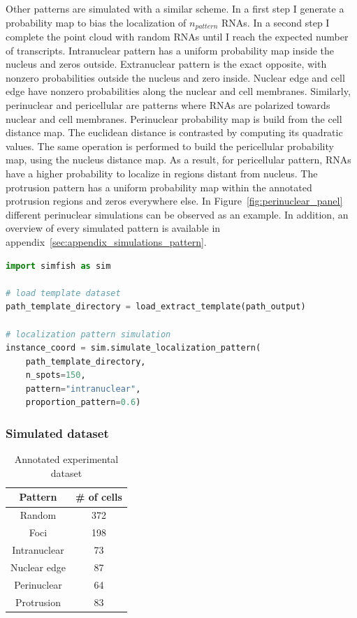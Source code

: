 Other patterns are simulated with a similar scheme.
In a first step I generate a probability map to bias the localization of $n_{pattern}$ \ac{RNA}s.
In a second step I complete the point cloud with random \ac{RNA}s until I reach the expected number of transcripts.
Intranuclear pattern has a uniform probability map inside the nucleus and zeros outside.
Extranuclear pattern is the exact opposite, with nonzero probabilities outside the nucleus and zero inside.
Nuclear edge and cell edge have nonzero probabilities along the nuclear and cell membranes.
Similarly, perinuclear and pericellular are patterns where \ac{RNA}s are polarized towards nuclear and cell membranes.
Perinuclear probability map is build from the cell distance map.
The euclidean distance is contrasted by computing its quadratic values.
The same operation is performed to build the pericellular probability map, using the nucleus distance map.
As a result, for pericellular pattern, \ac{RNA}s have a higher probability to localize in regions distant from nucleus.
The protrusion pattern has a uniform probability map within the annotated protrusion regions and zeros everywhere else.
In Figure~\ref{fig:perinuclear_panel} different perinuclear simulations can be observed as an example.
In addition, an overview of every simulated pattern is available in appendix~\ref{sec:appendix_simulations_pattern}.\\


\begin{minipage}{0.9\textwidth}
\begin{lstlisting}[language=Python]
import simfish as sim

# load template dataset
path_template_directory = load_extract_template(path_output)

# localization pattern simulation
instance_coord = sim.simulate_localization_pattern(
	path_template_directory,
	n_spots=150,
	pattern="intranuclear",
	proportion_pattern=0.6)
\end{lstlisting}
\end{minipage}

\subsubsection{Simulated dataset}

\begin{table}
	\centering
	\begin{tabular}{| c | c |}
		\hline
		Pattern & \# of cells \\
		\hline
		Random & 372\\
		Foci & 198\\
		Intranuclear & 73\\
		Nuclear edge & 87\\
		Perinuclear & 64\\
		Protrusion & 83\\
		\hline
	\end{tabular}
	\caption[Annotated experimental dataset for RNA localization patterns]{Annotated experimental dataset}
	\label{table:real_dataset}
\end{table}

